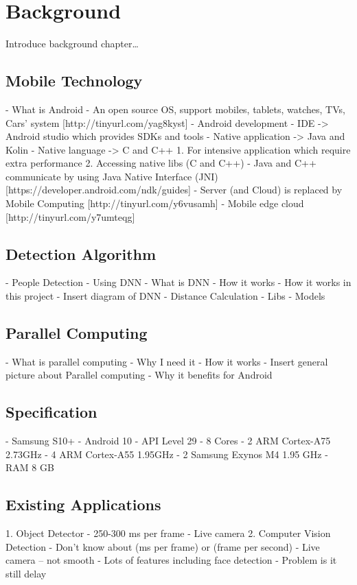 \chapter{Background}\label{background}
    Introduce background chapter…
    \section{Mobile Technology}
        -	What is Android
            - An open source OS, support mobiles, tablets, watches, TVs, Cars’ system [http://tinyurl.com/yag8kyst]
        -	Android development
            - IDE -> Android studio which provides SDKs and tools
            - Native application -> Java and Kolin
            - Native language -> C and C++
                1.	For intensive application which require extra performance
                2.	Accessing native libs (C and C++)
            - Java and C++ communicate by using Java Native Interface (JNI) [https://developer.android.com/ndk/guides]
        -	Server (and Cloud) is replaced by Mobile Computing [http://tinyurl.com/y6vusamh]
        -	Mobile edge cloud [http://tinyurl.com/y7umteqg]

    \section{Detection Algorithm}
        -	People Detection
            - Using DNN
            - What is DNN
            - How it works
            - How it works in this project
                - Insert diagram of DNN
        -	Distance Calculation
        -	Libs
        -	Models

    \section{Parallel Computing}
        -	What is parallel computing
        -	Why I need it
        -	How it works
            - Insert general picture about Parallel computing
        -	Why it benefits for Android


    \section{Specification}
        -	Samsung S10+
        -	Android 10
        -	API Level 29
        -	8 Cores
            - 2 ARM Cortex-A75 2.73GHz
            - 4 ARM Cortex-A55 1.95GHz
            - 2 Samsung Exynos M4 1.95 GHz
        -	RAM 8 GB


    \section{Existing Applications}
        1.	Object Detector
            -	250-300 ms per frame
            -	Live camera
        2.	Computer Vision Detection
            -	Don’t know about (ms per frame) or (frame per second)
            -	Live camera – not smooth
            -	Lots of features including face detection
            -	Problem is it still delay
